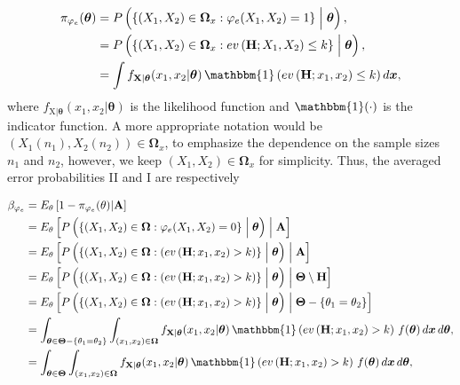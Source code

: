 \documentclass[AMA,Times1COL]{WileyNJDv5} %
\newcommand{\bX}{\boldsymbol{\mathrm{X}}}
\begin{document}
\begin{align}
\pi_{\varphi_{e}}(\boldsymbol{\theta})&=P\left( \left\lbrace (X_{1}, X_{2}) \in \boldsymbol{\Omega}_x:\varphi_{e}(X_{1}, X_{2})=1 \right\rbrace \Bigm| \boldsymbol{\theta}\right),\nonumber\\ 
&=P\left( \left\lbrace (X_{1}, X_{2}) \in \boldsymbol{\Omega}_x: ev\left(\text{\textbf{H}};X_{1}, X_{2}\right)\leq 
k\right\rbrace \Bigm| \boldsymbol{\theta}\right),\\
&=\int f_{{\bX \vert \boldsymbol{\theta}}}(x_{1}, x_{2}\vert \boldsymbol{\theta}) \, \mathbbm{1} \left(ev\left(\text{\textbf{H}};x_{1}, x_{2} \right)\leq 
k\right)d\boldsymbol{x},\nonumber
\end{align}where $f_{{\bX \vert \boldsymbol{\theta}}}(x_{1}, x_{2}\vert \boldsymbol{\theta})$ is the likelihood function and $\mathbbm{1}(\cdot)$ is the indicator function. A more appropriate notation would be $(X_{1}(n_1), X_{2}(n_2)) \in \boldsymbol{\Omega}_x$, to emphasize the dependence on the sample sizes $n_1$ and $n_2$, however, we keep $(X_{1}, X_{2}) \in \boldsymbol{\Omega}_x$ for simplicity. Thus, the averaged error probabilities II and I are respectively

\begin{align}\label{erro2}
\beta_{\varphi_{e}} &=  E_\theta\left[ 1-\pi_{\varphi_{e}}(\theta)\vert \text{\textbf{A}}\right]\nonumber\\
   & =  E_\theta\left[P\left(\left\lbrace (X_{1}, X_{2})  \in \boldsymbol{\Omega}:\varphi_{e}(X_{1}, X_{2}) =0\right\rbrace\Bigm|\boldsymbol{\theta}\right) \Bigm\vert \text{\textbf{A}}\right]\nonumber\\
   & = E_\theta\left[P\left(\left\lbrace (X_{1}, X_{2})  \in \boldsymbol{\Omega}:\left(ev\left(\text{\textbf{H}};x_{1}, x_{2} \right)> 
k\right)\right\rbrace\Bigm|\boldsymbol{\theta}\right) \Bigm\vert \text{\textbf{A}}\right]\nonumber\\
  & = E_\theta\left[P\left(\left\lbrace (X_{1}, X_{2})  \in \boldsymbol{\Omega}:\left(ev\left(\text{\textbf{H}};x_{1}, x_{2} \right)> 
k\right)\right\rbrace\Bigm|\boldsymbol{\theta}\right) \Bigm\vert \boldsymbol{\Theta}\setminus \text{\textbf{H}}\right]\nonumber\\
& = E_\theta\left[P\left(\left\lbrace (X_{1}, X_{2})  \in \boldsymbol{\Omega}:\left(ev\left(\text{\textbf{H}};x_{1}, x_{2} \right)> 
k\right)\right\rbrace\Bigm|\boldsymbol{\theta}\right) \Bigm\vert \boldsymbol{\Theta} - \{\theta_1=\theta_2\} \right]\nonumber\\
& = \int_{ \boldsymbol{\theta} \in \boldsymbol{\Theta} - \{\theta_1=\theta_2\}}\int_{(x_{1}, x_{2}) \in \boldsymbol{\Omega}} f_{{\bX \vert \boldsymbol{\theta}}}(x_{1}, x_{2}\vert \boldsymbol{\theta}) \, \mathbbm{1} \left(ev\left(\text{\textbf{H}};x_{1}, x_{2} \right)> 
k\right) \, f(\boldsymbol{\theta}) \, d\boldsymbol{x} \,d\boldsymbol{\theta},\nonumber\\
& = \int_{ \boldsymbol{\theta} \in \boldsymbol{\Theta} }\int_{(x_{1}, x_{2}) \in \boldsymbol{\Omega}} f_{{\bX \vert \boldsymbol{\theta}}}(x_{1}, x_{2}\vert \boldsymbol{\theta}) \, \mathbbm{1} \left(ev\left(\text{\textbf{H}};x_{1}, x_{2} \right)> 
k\right) \, f(\boldsymbol{\theta}) \, d\boldsymbol{x} \,d\boldsymbol{\theta},
\end{align}
\end{document}

